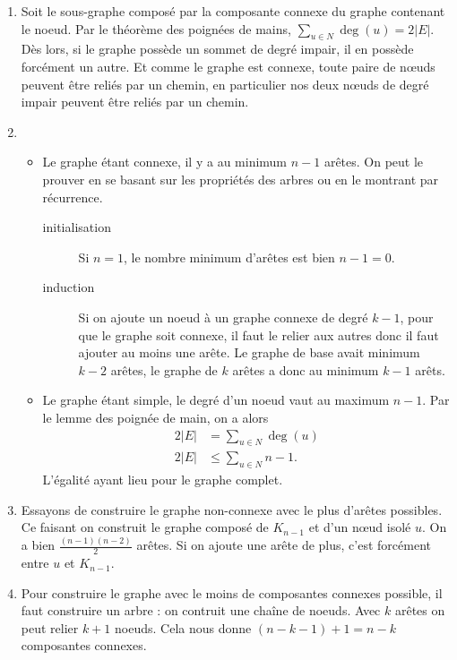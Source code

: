 \begin{solution}
  \begin{enumerate}
    \item Soit le sous-graphe composé par la composante connexe du graphe contenant le noeud.
      Par le théorème des poignées de mains, $\sum_{u \in N} \deg(u) = 2|E|$.
      Dès lors, si le graphe possède un sommet de degré impair, il en possède forcément un autre.
      Et comme le graphe est connexe, toute paire de nœuds peuvent être reliés par un chemin,
      en particulier nos deux nœuds de degré impair peuvent être reliés par un chemin.
    \item
      \begin{itemize}
        \item Le graphe étant connexe, il y a au minimum $n-1$ arêtes.
          On peut le prouver en se basant sur les propriétés des arbres ou en le montrant par récurrence.
          \begin{description}
            \item[initialisation] Si $n = 1$, le nombre minimum d'arêtes est bien $n - 1 = 0$.
            \item[induction] Si on ajoute un noeud à un graphe connexe de degré $k-1$,
              pour que le graphe soit connexe, il faut
              le relier aux autres donc il faut ajouter au moins une arête.
              Le graphe de base avait minimum $k-2$ arêtes,
              le graphe de $k$ arêtes a donc au minimum $k-1$ arêts.
          \end{description}
        \item Le graphe étant simple, le degré d'un noeud vaut au maximum $n-1$.
          Par le lemme des poignée de main, on a alors
          \begin{align*}
            2|E| & = \sum_{u \in N} \deg(u)\\
            2|E| & \leq \sum_{u \in N} n-1.
          \end{align*}
          L'égalité ayant lieu pour le graphe complet.
      \end{itemize}
    \item Essayons de construire le graphe non-connexe avec le plus d'arêtes possibles.
      Ce faisant on construit le graphe composé de $K_{n-1}$ et d'un nœud isolé $u$.
      On a bien $\frac{(n-1)(n-2)}{2}$ arêtes.
      Si on ajoute une arête de plus, c'est forcément entre $u$ et $K_{n-1}$.
    \item Pour construire le graphe avec le moins de composantes connexes possible, il faut construire un arbre : on contruit une chaîne de noeuds. Avec $k$ arêtes on peut relier $k+1$ noeuds. Cela nous donne $(n-k-1)+1=n-k$ composantes connexes.
  \end{enumerate}
\end{solution}

